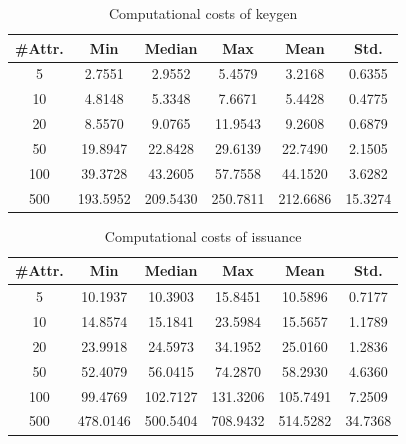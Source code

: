 \documentclass[9pt,conference]{IEEEtran}
\begin{document}
\begin{table}
\centering
\caption{Computational costs of keygen}
\label{keygen}
\begin{tabular}{cccccc}
\textbf{\#Attr.} & \textbf{Min} & \textbf{Median} & \textbf{Max} & \textbf{Mean} & \textbf{Std.} \\ \hline
5                &   2.7551           & 2.9552                &   5.4579           &   3.2168            & 0.6355              \\
10               & 4.8148             &  5.3348               & 7.6671             &  5.4428             & 0.4775              \\
20               & 8.5570             &  9.0765               & 11.9543             & 9.2608              & 0.6879              \\
50               & 19.8947             & 22.8428                & 29.6139             & 22.7490              &  2.1505             \\
100              &  39.3728            & 43.2605                & 57.7558             &  44.1520             &  3.6282             \\
500              &193.5952              & 209.5430                &250.7811              &212.6686               & 15.3274             
\end{tabular}
\end{table}

\begin{table}
\centering
\caption{Computational costs of issuance}
\label{issuance}
\begin{tabular}{cccccc}
\textbf{\#Attr.} & \textbf{Min} & \textbf{Median} & \textbf{Max} & \textbf{Mean} & \textbf{Std.} \\ \hline
5                & 10.1937             & 10.3903                &  15.8451            & 10.5896              & 0.7177              \\
10               & 14.8574             & 15.1841                & 23.5984             & 15.5657              &  1.1789             \\
20               & 23.9918             & 24.5973                & 34.1952             & 25.0160              &  1.2836             \\
50               & 52.4079             &  56.0415               &74.2870              &  58.2930             &  4.6360             \\
100              & 99.4769             & 102.7127                &131.3206              &  105.7491             &  7.2509             \\
500              & 478.0146             & 500.5404                & 708.9432             & 514.5282              & 34.7368             
\end{tabular}
\end{table}
\end{document}
